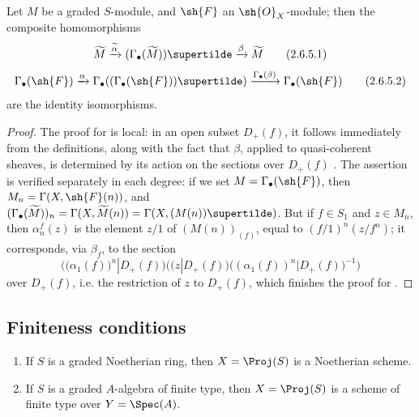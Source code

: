 \begin{proposition}[2.6.5]
\label{II.2.6.5}
Let $M$ be a graded $S$-module, and $\sh{F}$ an $\sh{O}_X$-module;
then the composite homomorphisms
\[
\label{II.2.6.5.1}
  \widetilde{M}
  \xrightarrow{\widetilde{\alpha}} (\Gamma_\bullet(\widetilde{M}))\supertilde
  \xrightarrow{\beta} \widetilde{M}
\tag{2.6.5.1}
\]
\[
\label{II.2.6.5.2}
  \Gamma_\bullet(\sh{F})
  \xrightarrow{\alpha} \Gamma_\bullet((\Gamma_\bullet(\sh{F}))\supertilde)
  \xrightarrow{\Gamma_\bullet(\beta)} \Gamma_\bullet(\sh{F})
\tag{2.6.5.2}
\]
are the identity isomorphisms.
\end{proposition}

\begin{proof}
The proof for  is local:
in an open subset $D_+(f)$, it follows immediately from the definitions, along with the fact that $\beta$, applied to quasi-coherent sheaves, is determined by its action on the sections over $D_+(f)$ .
The assertion  is verified separately in each degree:
if we set $M=\Gamma_\bullet(\sh{F})$, then $M_n=\Gamma(X,\sh{F}(n))$, and $(\Gamma_\bullet(\widetilde{M}))_n=\Gamma(X,\widetilde{M}(n))=\Gamma(X,(M(n))\supertilde)$.
But if $f\in S_1$ and $z\in M_n$, then $\alpha_n^f(z)$ is the element $z/1$ of $(M(n))_{(f)}$, equal to $(f/1)^n(z/f^n)$;
it corresponds, via $\beta_f$, to the section
\[
  \Big(\big(\alpha_1(f)\big)^n|D_+(f)\Big) \Big(\big(z|D_+(f)\big)\big((\alpha_1(f))^n|D_+(f)\big)^{-1}\Big)
\]
over $D_+(f)$, i.e. the restriction of $z$ to $D_+(f)$, which finishes the proof for .
\end{proof}


\subsection{Finiteness conditions}
\label{subsection:II.2.7}

\begin{proposition}[2.7.1]
\label{II.2.7.1}
\begin{enumerate}
  \item[{\rm(i)}] If $S$ is a graded Noetherian ring, then $X=\Proj(S)$ is a Noetherian scheme.
  \item[{\rm(ii)}] If $S$ is a graded $A$-algebra of finite type, then $X=\Proj(S)$ is a scheme of finite type over $Y=\Spec(A)$.
\end{enumerate}
\end{proposition}

